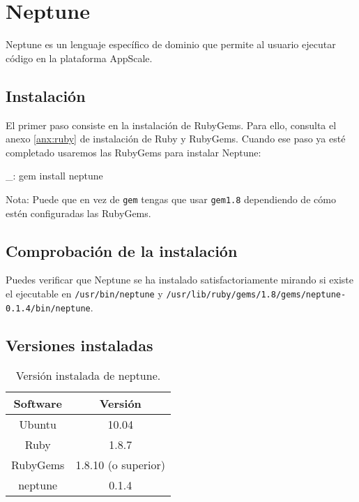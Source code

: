 \chapter{Neptune}
\label{anx:neptune}


Neptune es un lenguaje específico de dominio que permite al usuario ejecutar código en la plataforma AppScale.


\section{Instalación}

El primer paso consiste en la instalación de RubyGems. Para ello, consulta el anexo \ref{anx:ruby} de instalación de Ruby y RubyGems. Cuando ese paso ya esté completado usaremos las RubyGems para instalar Neptune:

\begin{bashcode}
_: gem install neptune
\end{bashcode}

Nota: Puede que en vez de \texttt{gem} tengas que usar \texttt{gem1.8} dependiendo de cómo estén configuradas las RubyGems.


\section{Comprobación de la instalación}

Puedes verificar que Neptune se ha instalado satisfactoriamente mirando si existe el ejecutable en \texttt{/usr/bin/neptune} y \texttt{/usr/lib/ruby/gems/1.8/gems/neptune-0.1.4/bin/neptune}.


\section{Versiones instaladas}

\begin{table}[!htbp]
\centering
   \begin{tabular}{|c|c|}
      \hline
      \textbf{Software} & \textbf{Versión} \\ \hline
      Ubuntu & 10.04 \\ \hline
      Ruby & 1.8.7 \\ \hline
      RubyGems & 1.8.10 (o superior) \\ \hline
      neptune & 0.1.4 \\ \hline
   \end{tabular}
\caption{Versión instalada de neptune.}
\label{table:neptune-versions}
\end{table}
